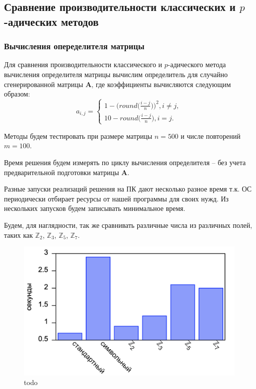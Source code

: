 \documentclass[master, och, diploma, times]{sty/SCWorks}
\theoremstyle{plain}
\theoremstyle{definition}
\begin{document}
\subsection{Сравнение производительности классических и $p$-адических методов}

\subsubsection{Вычисления опеределителя матрицы}

Для сравнения производительности классического и $p$-адического метода вычисления определителя матрицы вычислим определитель для случайно сгенерированной матрицы $\boldsymbol{A}$, где коэффициенты вычисляются следующим образом:
$$
a_{i,j}= 
\begin{cases} 
1-\bigg(round\bigg(\frac{i-j}{n}\bigg)\bigg)^2, i \neq j, \\ 
10-round\bigg(\frac{i-j}{n}\bigg), i = j.
\end{cases}
$$

Методы будем тестировать при размере матрицы $n=500$ и числе повторений $m=100$.

Время решения будем измерять по циклу вычисления определителя – без учета предварительной подготовки матрицы $\boldsymbol{A}$.

Разные запуски реализаций решения на ПК дают несколько разное время т.к. ОС периодически отбирает ресурсы от нашей программы для своих нужд. Из нескольких запусков будем записывать минимальное время.

Будем, для наглядности, так же сравнивать различные числа из различных полей, таких как $\mathbb{Z}_2$, $\mathbb{Z}_3$, $\mathbb{Z}_5$, $\mathbb{Z}_7$.

\begin{figure}[H]
\centerline{\includegraphics[width=0.85\linewidth]{../gnuplot/single/det/plot.png}}
\caption{todo}
\label{img:single:det}
\end{figure}
\end{document}
